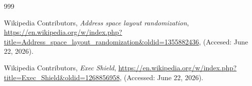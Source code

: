 \documentclass[11pt,a4paper,twocolumn]{article}
\begin{document}
\begin{thebibliography}{999}

Wikipedia Contributors,
\textit{Address space layout randomization},
\url{https://en.wikipedia.org/w/index.php?title=Address_space_layout_randomization&oldid=1355882436},
(Accesed: June 22, 2026).

Wikipedia Contributors,
\textit{Exec Shield},
\url{https://en.wikipedia.org/w/index.php?title=Exec_Shield&oldid=1268856958},
(Accessed: June 22, 2026).

\end{thebibliography}
\end{document}
